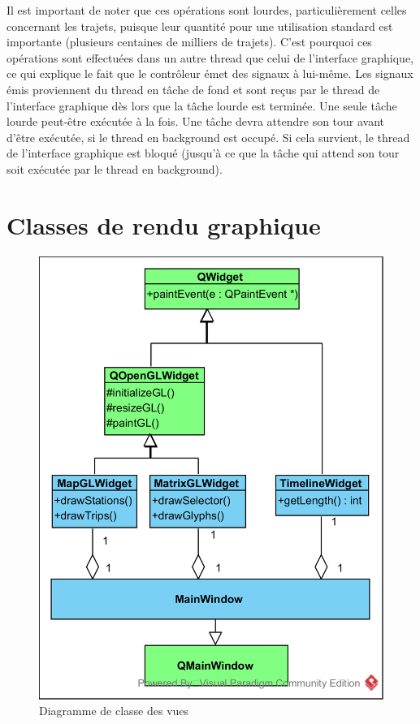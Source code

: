 \documentclass[12pt]{article}
\begin{document}
	Il est important de noter que ces opérations sont lourdes, particulièrement celles concernant les trajets, puisque leur quantité pour une utilisation standard est importante (plusieurs centaines de milliers de trajets). C’est pourquoi ces opérations sont effectuées dans un autre thread que celui de l’interface graphique, ce qui explique le fait que le contrôleur émet des signaux à lui-même. Les signaux émis proviennent du thread en tâche de fond et sont reçus par le thread de l’interface graphique dès lors que la tâche lourde est terminée. Une seule tâche lourde peut-être exécutée à la fois. Une tâche devra attendre son tour avant d’être exécutée, si le thread en background est occupé. Si cela survient, le thread de l’interface graphique est bloqué (jusqu’à ce que la tâche qui attend son tour soit exécutée par le thread en background).\\
		
	\newpage
	\section{Classes de rendu graphique}
	
	\begin{figure}[!h]
	\begin{center}
	\includegraphics[scale=1]{dia_class_rendering.png}
	\caption{Diagramme de classe des vues}
	\label{fig:renduGraphique}
	\end{center}
	\end{figure}
	
\end{document}
